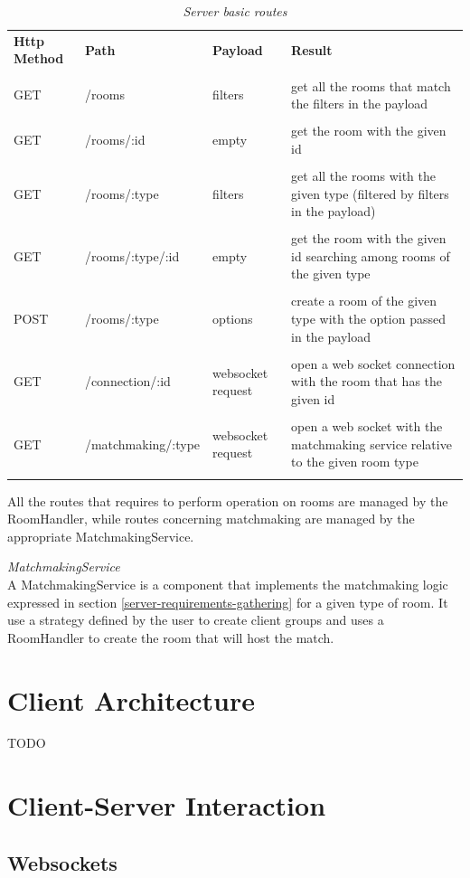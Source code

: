 \begin{table}[H]
	\begin{tabular}{p{2cm}p{4cm}p{2cm}p{5.5cm}}
		\textbf{Http Method} & \textbf{Path}	  & \textbf{Payload}  & \textbf{Result}                                                            		\\\\
		GET                  & /rooms             & filters           & get all the rooms that match the filters in the payload                        	\\\\
		GET                  & /rooms/:id         & empty             & get the room with the given id                                                 	\\\\
		GET                  & /rooms/:type       & filters           & get all the rooms with the given type (filtered by filters in the payload)     	\\\\
		GET                  & /rooms/:type/:id   & empty             & get the room with the given id searching among rooms of the given type         	\\\\
		POST                 & /rooms/:type       & options           & create a room of the given type with the option passed in the payload          	\\\\
		GET                  & /connection/:id    & websocket request & open a web socket connection with the room that has the given id               	\\\\
		GET                  & /matchmaking/:type & websocket request & open a web socket with the matchmaking service relative to the given room type 	\\\\
	\end{tabular}
	\caption{\label{table:server_routes} \textit{Server basic routes}}
\end{table}

All the routes that requires to perform operation on rooms are managed by the RoomHandler, while routes concerning matchmaking are managed by the appropriate MatchmakingService.


\bigskip
\textit{MatchmakingService}
\\
A MatchmakingService is a component that implements the matchmaking logic expressed in section \ref{server-requirements-gathering} for a given type of room. It use a strategy defined by the user to create client groups and uses a RoomHandler to create the room that will host the match.


\section{Client Architecture}

TODO

\section{Client-Server Interaction}
\subsection{Websockets}








